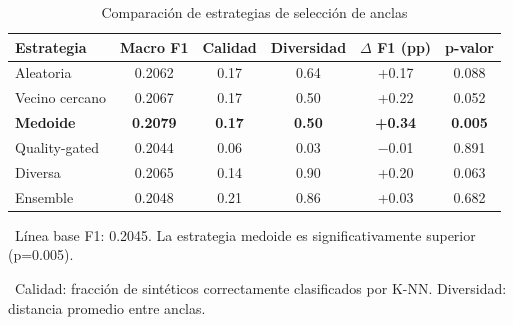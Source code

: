 \begin{table}[htbp]
\centering
\caption{Comparación de estrategias de selección de anclas}
\label{tab:anchor_strategies}
\begin{tabular}{lccccc}
\toprule
\textbf{Estrategia} & \textbf{Macro F1} & \textbf{Calidad} & \textbf{Diversidad} & \textbf{$\Delta$ F1 (pp)} & \textbf{p-valor} \\
\midrule
Aleatoria & 0.2062 & 0.17 & 0.64 & +0.17 & 0.088 \\
Vecino cercano & 0.2067 & 0.17 & 0.50 & +0.22 & 0.052 \\
\rowcolor{green!20}
\textbf{Medoide} & \textbf{0.2079} & \textbf{0.17} & \textbf{0.50} & \textbf{+0.34} & \textbf{0.005} \\
Quality-gated & 0.2044 & 0.06 & 0.03 & $-$0.01 & 0.891 \\
Diversa & 0.2065 & 0.14 & 0.90 & +0.20 & 0.063 \\
Ensemble & 0.2048 & 0.21 & 0.86 & +0.03 & 0.682 \\
\bottomrule
\end{tabular}
\vspace{0.5em}\footnotesize

\textbullet\ Línea base F1: 0.2045. La estrategia medoide es significativamente superior (p=0.005).

\textbullet\ Calidad: fracción de sintéticos correctamente clasificados por K-NN. Diversidad: distancia promedio entre anclas.

\end{table}
